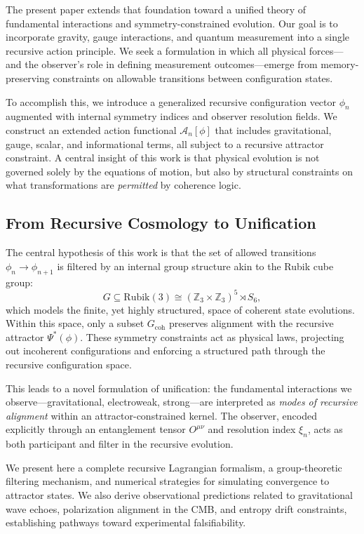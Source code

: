 \documentclass[11pt]{article}
\begin{document}
The present paper extends that foundation toward a unified theory of fundamental interactions and symmetry-constrained evolution. Our goal is to incorporate gravity, gauge interactions, and quantum measurement into a single recursive action principle. We seek a formulation in which all physical forces—and the observer’s role in defining measurement outcomes—emerge from memory-preserving constraints on allowable transitions between configuration states.

To accomplish this, we introduce a generalized recursive configuration vector $\phi_n$ augmented with internal symmetry indices and observer resolution fields. We construct an extended action functional $\mathcal{A}_n[\phi]$ that includes gravitational, gauge, scalar, and informational terms, all subject to a recursive attractor constraint. A central insight of this work is that physical evolution is not governed solely by the equations of motion, but also by structural constraints on what transformations are \textit{permitted} by coherence logic.

\subsection{From Recursive Cosmology to Unification}

The central hypothesis of this work is that the set of allowed transitions $\phi_n \to \phi_{n+1}$ is filtered by an internal group structure akin to the Rubik cube group:
\[
G \subseteq \text{Rubik}(3) \cong ( \mathbb{Z}_3 \times \mathbb{Z}_3 )^5 \rtimes S_6,
\]
which models the finite, yet highly structured, space of coherent state evolutions. Within this space, only a subset $G_{\text{coh}}$ preserves alignment with the recursive attractor $\Psi^*(\phi)$. These symmetry constraints act as physical laws, projecting out incoherent configurations and enforcing a structured path through the recursive configuration space.

This leads to a novel formulation of unification: the fundamental interactions we observe—gravitational, electroweak, strong—are interpreted as \textit{modes of recursive alignment} within an attractor-constrained kernel. The observer, encoded explicitly through an entanglement tensor $O^{\mu\nu}$ and resolution index $\xi_n$, acts as both participant and filter in the recursive evolution.

We present here a complete recursive Lagrangian formalism, a group-theoretic filtering mechanism, and numerical strategies for simulating convergence to attractor states. We also derive observational predictions related to gravitational wave echoes, polarization alignment in the CMB, and entropy drift constraints, establishing pathways toward experimental falsifiability.
\end{document}
